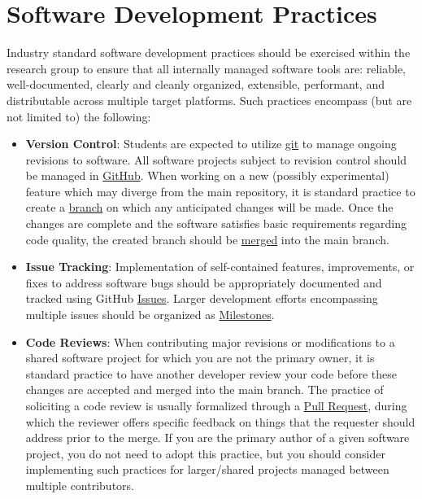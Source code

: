\documentclass[12pt,a4paper,article,oneside]{memoir} %
\begin{document}
\section{Software Development Practices} \label{sec:software_development_practices}

Industry standard software development practices should be exercised within the research group to ensure that all internally managed software tools are: reliable, well-documented, clearly and cleanly organized, extensible, performant, and distributable across multiple target platforms. Such practices encompass (but are not limited to) the following:
\begin{itemize}
\item \textbf{Version Control}: Students are expected to utilize \href{https://git-scm.com}{git} to manage ongoing revisions to software. All software projects subject to revision control should be managed in \href{https://github.com}{GitHub}. When working on a new (possibly experimental) feature which may diverge from the main repository, it is standard practice to create a \href{https://docs.github.com/en/pull-requests/collaborating-with-pull-requests/proposing-changes-to-your-work-with-pull-requests/creating-and-deleting-branches-within-your-repository}{branch} on which any anticipated changes will be made. Once the changes are complete and the software satisfies basic requirements regarding code quality, the created branch should be \href{https://docs.github.com/en/repositories/configuring-branches-and-merges-in-your-repository/configuring-pull-request-merges/about-merge-methods-on-github}{merged} into the main branch.
\item \textbf{Issue Tracking}: Implementation of self-contained features, improvements, or fixes to address software bugs should be appropriately documented and tracked using GitHub \href{https://docs.github.com/en/issues/tracking-your-work-with-issues/about-issues}{Issues}. Larger development efforts encompassing multiple issues should be organized as \href{https://docs.github.com/en/issues/using-labels-and-milestones-to-track-work/about-milestones}{Milestones}.
\item \textbf{Code Reviews}: When contributing major revisions or modifications to a shared software project for which you are not the primary owner, it is standard practice to have another developer review your code before these changes are accepted and merged into the main branch. The practice of soliciting a code review is usually formalized through a \href{https://docs.github.com/en/pull-requests/collaborating-with-pull-requests/proposing-changes-to-your-work-with-pull-requests/about-pull-requests}{Pull Request}, during which the reviewer offers specific feedback on things that the requester should address prior to the merge. If you are the primary author of a given software project, you do not need to adopt this practice, but you should consider implementing such practices for larger/shared projects managed between multiple contributors.

\end{itemize}
\end{document}
